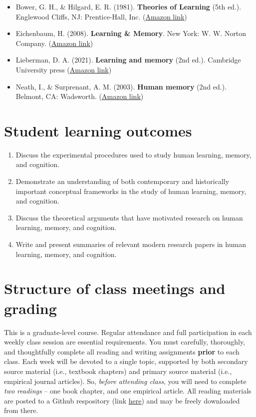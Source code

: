 \documentclass[10pt]{article}
\begin{document}
\begin{itemize}
\item Bower, G. H., \& Hilgard, E. R. (1981). \textbf{Theories of Learning} (5th ed.). Englewood Cliffs, NJ: Prentice-Hall, Inc. (\href{https://www.amazon.com/Theories-Learning-5th-Gordon-Bower/dp/0139144323}{Amazon link})
\item Eichenbaum, H. (2008). \textbf{Learning \& Memory}. New York: W. W. Norton Company. (\href{https://www.amazon.com/Learning-Memory-Howard-Eichenbaum/dp/0393924475}{Amazon link})
\item Lieberman, D. A. (2021). \textbf{Learning and memory} (2nd ed.). Cambridge University press (\href{https://www.amazon.com/Learning-Memory-David-Lieberman/dp/1108428614/}{Amazon link})
\item Neath, I., \& Surprenant, A. M. (2003). \textbf{Human memory} (2nd ed.). Belmont, CA: Wadsworth. (\href{https://www.amazon.com/Human-Memory-second-Neath-Surprenant/dp/B00BUWB592/}{Amazon link})
\end{itemize}

\section*{Student learning outcomes}
\label{sec:orgb365752}

\begin{enumerate}
\item Discuss the experimental procedures used to study human learning, memory, and cognition.
\item Demonstrate an understanding of both contemporary and historically important conceptual frameworks in the study of human learning, memory, and cognition.
\item Discuss the theoretical arguments that have motivated research on human learning, memory, and cognition.
\item Write and present summaries of relevant modern research papers in human learning, memory, and cognition.
\end{enumerate}

\section*{Structure of class meetings and grading}
\label{sec:org5903d06}

This is a graduate-level course. Regular attendance and full participation in each weekly class session are essential requirements. You must carefully, thoroughly, and thoughtfully complete all reading and writing assignments \textbf{prior} to each class.  
Each week will be devoted to a single topic, supported by both secondary source material (i.e., textbook chapters) and primary source material (i.e., empirical journal articles). So, \emph{before attending class}, you will need to complete \emph{two readings} -- one book chapter, and one empirical article.  All reading materials are posted to a Github respository (link \href{https://github.com/tomfaulkenberry/courses/tree/master/canvas/5303/readings}{here}) and may be freely downloaded from there.
\end{document}
